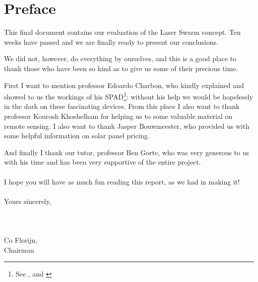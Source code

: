 \chapter*{Preface}

This final document contains our evaluation of the Laser Swarm concept. Ten weeks have passed and we are finally ready to present our conclusions.

We did not, however, do everything by ourselves, and this is a good place to thank those who have been so kind as to give us some of their precious time.

First I want to mention professor Edoardo Charbon, who kindly explained and showed to us the workings of his \ac{SPAD}\footnote{See \cite[98-105]{SPADThesis}, \cite{SPAD2} and \cite{SPAD3}}: without his help we would be hopelessly in the dark on these fascinating devices. From this place I also want to thank professor Kourosh Khoshelham for helping us to some valuable material on remote sensing. I also want to thank Jasper Bouwmeester, who provided us with some helpful information on solar panel pricing.

And finally I thank our tutor, professor Ben Gorte, who was very generous to us with his time and has been very supportive of the entire project.\\\\
I hope you will have as much fun reading this report, as we had in making it!\\\\
Yours sincerely,\\\\\\\\
 \hspace{2cm}Co Florijn,\\
 \hspace{2cm}Chairman